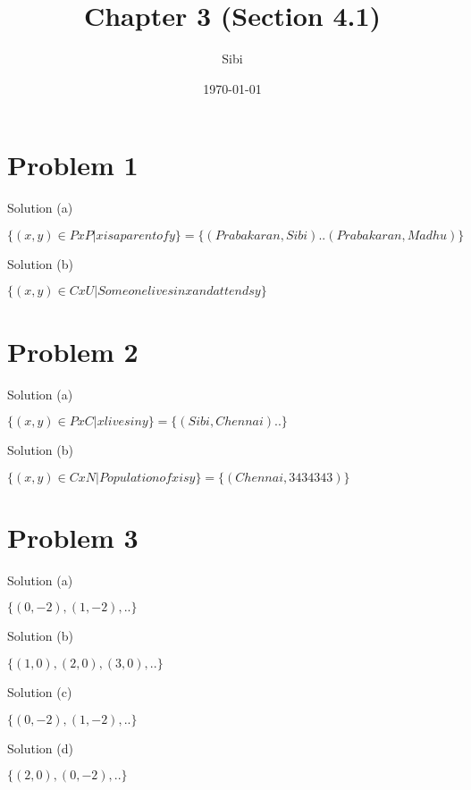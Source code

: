 \documentclass{article}
\begin{document}
\title{Chapter 3 (Section 4.1)}
\author{Sibi}
\date{\today}
\maketitle
\newpage

\section{Problem 1}

Solution (a)

$\{(x,y) \in P x P | x is a parent of y \} = \{(Prabakaran, Sibi) ..
(Prabakaran, Madhu)\}$ 

Solution (b)

$\{(x,y) \in C x U | Someone lives in x and attends y \}$

\section{Problem 2}

Solution (a)

$\{(x,y) \in P x C | x lives in y \} = \{(Sibi, Chennai) .. \}$

Solution (b)

$\{(x,y) \in C x N | Population of x is y \} = \{(Chennai, 3434343)\}$

\section{Problem 3}

Solution (a)

$\{(0,-2), (1,-2), ..\}$

Solution (b)

$\{(1,0), (2,0), (3,0), ..\}$

Solution (c)

$\{(0,-2), (1,-2), ..\}$

Solution (d)

$\{(2,0), (0, -2), ..\}$
\end{document}
